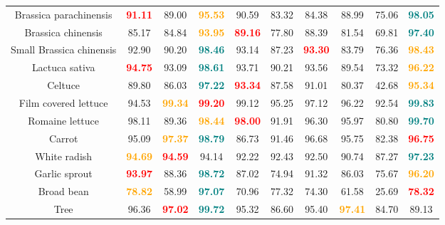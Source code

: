 \begin{table}[!hbt]
{\begin{tabular}{c|cccccccc|c}
        Brassica parachinensis & \textcolor{red}{\textbf{91.11}} & 89.00 & \textcolor{orange}{\textbf{95.53}} &  90.59 & 83.32 & 84.38 & 88.99 & 75.06 & \textcolor{teal}{\textbf{98.05}} \\ 
        Brassica chinensis     & 85.17 & 84.84 & \textcolor{orange}{\textbf{93.95}} &  \textcolor{red}{\textbf{89.16}} & 77.80 & 88.39 & 81.54 & 69.81 & \textcolor{teal}{\textbf{97.40}} \\ 
        Small Brassica chinensis  & 92.90 & 90.20 & \textcolor{teal}{\textbf{98.46}} & 93.14  & 87.23 & \textcolor{red}{\textbf{93.30}} & 83.79 & 76.36 & \textcolor{orange}{\textbf{98.43}} \\ 
        Lactuca sativa   & \textcolor{red}{\textbf{94.75}} & 93.09 & \textcolor{teal}{\textbf{98.61}} & 93.71 & 90.21 & 93.56 & 89.54 & 73.32 & \textcolor{orange}{\textbf{96.22}} \\ 
        Celtuce    & 89.80 & 86.03 &\textcolor{teal}{\textbf{97.22}} &\textcolor{red}{\textbf{93.34}}  & 87.58 & 91.01 & 80.37 & 42.68 & \textcolor{orange}{\textbf{95.34}}\\ 
        Film covered lettuce   & 94.53 & \textcolor{orange}{\textbf{ 99.34}} & \textcolor{red}{\textbf{99.20}} & 99.12 & 95.25 & 97.12 & 96.22 & 92.54 & \textcolor{teal}{\textbf{99.83}} \\ 
        Romaine lettuce     & 98.11 & 89.36 & \textcolor{orange}{\textbf{98.44}} & \textcolor{red}{\textbf{98.00}}  & 91.91 & 96.30 & 95.97 & 80.80 & \textcolor{teal}{\textbf{99.70}} \\ 
        Carrot   & 95.09 & \textcolor{orange}{\textbf{97.37}} & \textcolor{teal}{\textbf{98.79}} & 86.73 & 91.46 &96.68 & 95.75 & 82.38 & \textcolor{red}{\textbf{96.75}} \\ 
        White radish     & \textcolor{orange}{\textbf{94.69}} &  \textcolor{red}{\textbf{94.59}} & 94.14 & 92.22 & 92.43 & 92.50 & 90.74 & 87.27 & \textcolor{teal}{\textbf{97.23}} \\ 
        Garlic sprout   & \textcolor{red}{\textbf{93.97}} & 88.36 & \textcolor{teal}{\textbf{98.72}} & 87.02  & 74.94 & 91.32 & 86.03 & 75.67 & \textcolor{orange}{\textbf{96.20}} \\ 
        Broad bean       & \textcolor{orange}{\textbf{78.82}} & 58.99 & \textcolor{teal}{\textbf{97.07}} & 70.96  & 77.32 & 74.30 & 61.58 & 25.69 & \textcolor{red}{\textbf{78.32}} \\ 
        Tree   & 96.36 & \textcolor{red}{\textbf{97.02}} & \textcolor{teal}{\textbf{99.72}} & 95.32 & 86.60 & 95.40 & \textcolor{orange}{\textbf{97.41}} & 84.70 & 89.13 \\ \hline
        

\end{tabular}}
\end{table}
